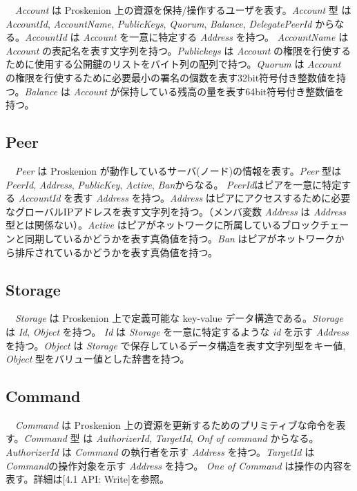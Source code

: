　\emph{Account} は Proskenion
上の資源を保持/操作するユーザを表す。\emph{Account} 型 は
\emph{AccountId}, \emph{AccountName}, \emph{PublicKeys}, \emph{Quorum},
\emph{Balance}, \emph{DelegatePeerId} からなる。\emph{AccountId} は
\emph{Account} を一意に特定する \emph{Address} を持つ。
\emph{AccountName} は \emph{Account}
の表記名を表す文字列を持つ。\emph{Publickeys} は \emph{Account}
の権限を行使するために使用する公開鍵のリストをバイト列の配列で持つ。\emph{Quorum}
は \emph{Account}
の権限を行使するために必要最小の署名の個数を表す32bit符号付き整数値を持つ。\emph{Balance}
は \emph{Account}
が保持している残高の量を表す64bit符号付き整数値を持つ。

\hypertarget{peer}{%
\subsection{Peer}\label{peer}}

　\emph{Peer} は Proskenion
が動作しているサーバ(ノード)の情報を表す。\emph{Peer} 型は
\emph{PeerId}, \emph{Address}, \emph{PublicKey}, \emph{Active},
\emph{Ban}からなる。 \emph{PeerId}はピアを一意に特定する
\emph{AccountId} を表す \emph{Address} を持つ。\emph{Address}
はピアにアクセスするために必要なグローバルIPアドレスを表す文字列を持つ。（メンバ変数
\emph{Address} は \emph{Address} 型とは関係ない）。\emph{Active}
はピアがネットワークに所属しているブロックチェーンと同期しているかどうかを表す真偽値を持つ。\emph{Ban}
はピアがネットワークから排斥されているかどうかを表す真偽値を持つ。

\hypertarget{storage}{%
\subsection{Storage}\label{storage}}

　\emph{Storage} は Proskenion 上で定義可能な key-value
データ構造である。\emph{Storage} は \emph{Id}, \emph{Object} を持つ。
\emph{Id} は \emph{Storage} を一意に特定するような \emph{id} を示す
\emph{Address} を持つ。\emph{Object} は \emph{Storage}
で保存しているデータ構造を表す文字列型をキー値, \emph{Object}
型をバリュー値とした辞書を持つ。

\hypertarget{command}{%
\subsection{Command}\label{command}}

　\emph{Command} は Proskenion
上の資源を更新するためのプリミティブな命令を表す。\emph{Command} 型 は
\emph{AuthorizerId}, \emph{TargetId}, \emph{Onf of command}
からなる。\emph{AuthorizerId} は \emph{Command} の執行者を示す
\emph{Address} を持つ。\emph{TargetId} は \emph{Command}の操作対象を示す
\emph{Address} を持つ。 \emph{One of Command}
は操作の内容を表す。詳細は{[}4.1 API: Write{]}を参照。

